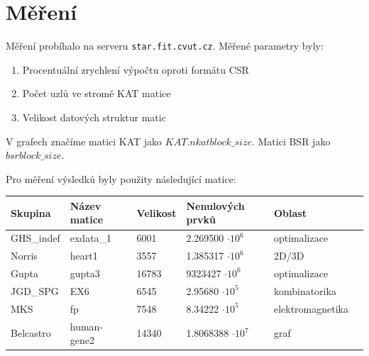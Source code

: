 



\section{Měření}

Měření probíhalo na serveru \texttt{star.fit.cvut.cz}. Měřené parametry byly:
\begin{enumerate}
  \item Procentuální zrychlení výpočtu oproti formátu CSR
  \item Počet uzlů ve stromě KAT matice
  \item Velikost datových struktur matic
\end{enumerate}

V grafech značíme matici KAT jako $KAT.n kat block\_size$. Matici BSR jako $bsr block\_size$. 

Pro měření výsledků byly použity následující matice:

\begin{table}[H]
   \begin{tabular}{llllll}
    Skupina    & Název matice & Velikost & Nenulových prvků            & Oblast                  \\
    \hline
    GHS\_indef 	& exdata\_1 \cite{mtxexdata}    &  6001    & 2.269500 $\cdot 10^6$ & optimalizace \\
    Norris     	& heart1 \cite{mtxheart}       & 3557    & 1.385317 $\cdot 10^6$ & 2D/3D          \\
    Gupta     	& gupta3 \cite{mtxgupta}       &  16783    & 9323427 $\cdot 10^6$ & optimalizace         \\
    JGD\_SPG    	& EX6 \cite{mtxex}       & 6545     & 2.95680 $\cdot 10^5$ & kombinatorika \\
    MKS     		& fp \cite{mtxfp}       & 7548     & 8.34222 $\cdot 10^5$ & elektromagnetika         \\
    Belcastro   	& human-gene2 \cite{mtxhuman}        & 14340    & 1.8068388 $\cdot 10^7$ & graf         \\
    \end{tabular}
\end{table}

